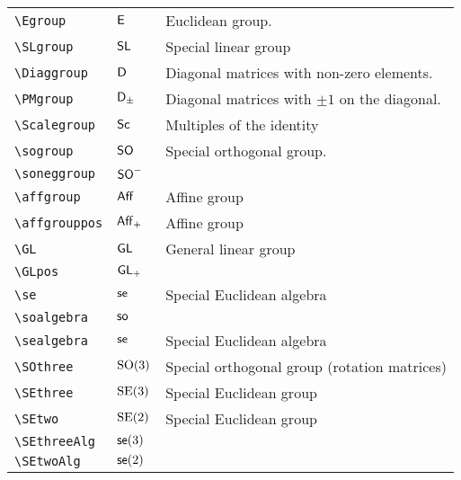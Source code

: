 \begin{longtable}{lll}
 {\color[rgb]{0.5,0.5,0.5}\texttt{\textbackslash Egroup}} & $\mathsf{E}$ &   Euclidean group.\\ 
 {\color[rgb]{0.5,0.5,0.5}\texttt{\textbackslash SLgroup}} & $\mathsf{SL}$ &   Special linear group\\ 
 {\color[rgb]{0.5,0.5,0.5}\texttt{\textbackslash Diaggroup}} & $\mathsf{D}$ &   Diagonal matrices with non-zero elements.\\ 
 {\color[rgb]{0.5,0.5,0.5}\texttt{\textbackslash PMgroup}} & $\mathsf{D}_{\pm}$ &   Diagonal matrices with $\pm 1$ on the diagonal.\\ 
 {\color[rgb]{0.5,0.5,0.5}\texttt{\textbackslash Scalegroup}} & $\mathsf{Sc}$ &   Multiples of the identity\\ 
 {\color[rgb]{0.5,0.5,0.5}\texttt{\textbackslash sogroup}} & $\mathsf{SO}$ &  Special orthogonal group.\\ 
 {\color[rgb]{0.5,0.5,0.5}\texttt{\textbackslash soneggroup}} & $\mathsf{SO}^{-}$ & \\ 
 {\color[rgb]{0.5,0.5,0.5}\texttt{\textbackslash affgroup}} & $\mathsf{Aff}$ &  Affine group \\ 
 {\color[rgb]{0.5,0.5,0.5}\texttt{\textbackslash affgrouppos}} & $\mathsf{Aff}_{+}$ &  Affine group \\ 
 {\color[rgb]{0.5,0.5,0.5}\texttt{\textbackslash GL}} & $\mathsf{GL}$ &  General linear group\\ 
 {\color[rgb]{0.5,0.5,0.5}\texttt{\textbackslash GLpos}} & $\mathsf{GL}_{+}$ &  \\ 
 {\color[rgb]{0.5,0.5,0.5}\texttt{\textbackslash se}} & $\mathsf{se}$ &  Special Euclidean algebra\\ 
 {\color[rgb]{0.5,0.5,0.5}\texttt{\textbackslash soalgebra}} & $\mathsf{so}$ & \\ 
 {\color[rgb]{0.5,0.5,0.5}\texttt{\textbackslash sealgebra}} & $\mathsf{se}$ &  Special Euclidean algebra\\ 
 {\color[rgb]{0.5,0.5,0.5}\texttt{\textbackslash SOthree}} & $\mathrm{SO(3)}$ &  Special orthogonal group (rotation matrices)\\ 
 {\color[rgb]{0.5,0.5,0.5}\texttt{\textbackslash SEthree}} & $\mathrm{SE(3)}$ &  Special Euclidean group \\ 
 {\color[rgb]{0.5,0.5,0.5}\texttt{\textbackslash SEtwo}} & $\mathrm{SE(2)}$ &  Special Euclidean group \\ 
 {\color[rgb]{0.5,0.5,0.5}\texttt{\textbackslash SEthreeAlg}} & $\mathsf{se}(3)$ & \\ 
 {\color[rgb]{0.5,0.5,0.5}\texttt{\textbackslash SEtwoAlg}} & $\mathsf{se}(2)$ & \\ 

\end{longtable}
